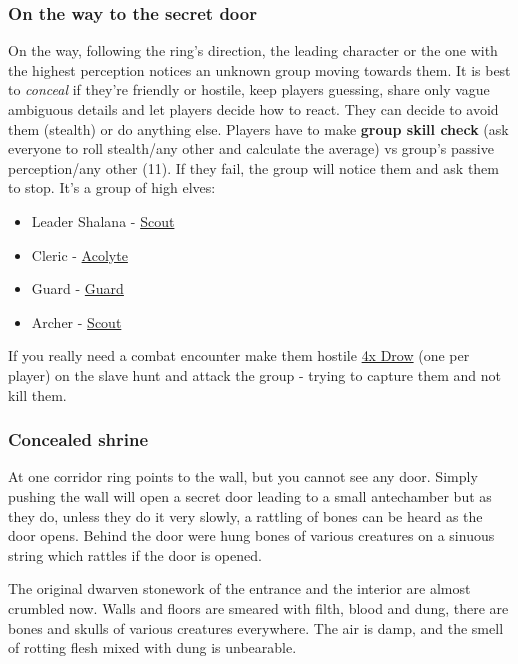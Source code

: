\documentclass[10pt,onecolumn,twoside,openany,bg=full,layout=true]{dndbook}
\begin{document}
\subsubsection{On the way to the secret door}
On the way, following the ring's direction, the leading character
or the one with the highest perception notices an unknown group moving towards them.
It is best to \emph{conceal} if they're friendly or hostile, keep players guessing, share only vague ambiguous details and let players decide how to react.
They can decide to avoid them (stealth) or do anything else.
Players have to make \textbf{group skill check} (ask everyone to roll stealth/any other and calculate the average) vs group's passive perception/any other (11).
If they fail, the group will notice them and ask them to stop.
It's a group of high elves:
\begin{itemize}
  \item Leader Shalana - \href{https://www.dndbeyond.com/monsters/17007-scout}{Scout}
  \item Cleric - \href{https://www.dndbeyond.com/monsters/16763-acolyte}{Acolyte}
  \item Guard - \href{https://www.dndbeyond.com/monsters/16915-guard}{Guard}
  \item Archer - \href{https://www.dndbeyond.com/monsters/17007-scout}{Scout}
\end{itemize}

If you really need a combat encounter make them hostile \href{https://www.dndbeyond.com/monsters/17133-drow}{4x Drow}
(one per player) on the slave hunt and attack the group - trying to capture them and not kill them.

\subsubsection{Concealed shrine}
At one corridor ring points to the wall, but you cannot see any door.
Simply pushing the wall will open a secret door leading to a small antechamber but as they do,
unless they do it very slowly, a rattling of bones can be heard as the door opens.
Behind the door were hung bones of various creatures on a sinuous string which rattles if the door is opened.

The original dwarven stonework of the entrance and the interior are almost crumbled now.
Walls and floors are smeared with filth, blood and dung, there are bones and skulls of various creatures everywhere.
The air is damp, and the smell of rotting flesh mixed with dung is unbearable.
\end{document}
